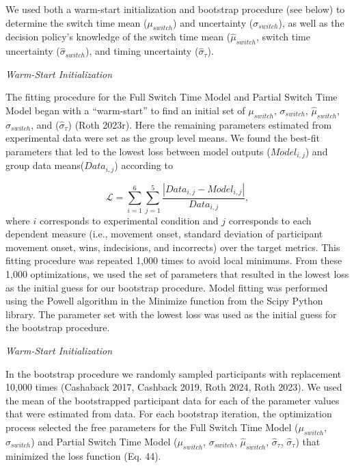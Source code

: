 \documentclass[12pt,letterpaper]{article}
\begin{document}
We used both a warm-start initialization and bootstrap procedure (see below) to determine the switch time mean ($\mu_{switch}$) and uncertainty ($\sigma_{switch}$), as well as the decision policy’s knowledge of the switch time mean ($\hat{\mu}_{switch}$, switch time uncertainty ($\hat{\sigma}_{switch}$), and timing uncertainty ($\hat{\sigma}_{\tau}$).

\noindent\emph{Warm-Start Initialization}

\noindent The fitting procedure for the Full Switch Time Model and Partial Switch Time Model began with a “warm-start” to find an initial set of $\mu_{switch}$, $\sigma_{switch}$, $\hat{\mu}_{switch}$, $\hat{\sigma}_{switch}$, and ($\hat{\sigma}_{\tau}$) (Roth 2023r).  Here the remaining parameters estimated from experimental data were set as the group level means. We found the best-fit parameters that led to the lowest loss between model outputs ($Model_{i,j}$) and group data means($Data_{i,j}$) according to

\begin{equation}
    \mathcal{L} = \sum_{i = 1}^{6} \sum_{j = 1}^{5} \frac{|Data_{i,j} - Model_{i,j}|}{Data_{i,j}},
\end{equation}
where $i$ corresponds to experimental condition and $j$ corresponds to each dependent measure (i.e., movement onset, standard deviation of participant movement onset, wins, indecisions, and incorrects) over the target metrics. This fitting procedure was repeated 1,000 times to avoid local minimums. From these 1,000 optimizations, we used the set of parameters that resulted in the lowest loss as the initial guess for our bootstrap procedure. Model fitting was performed using the Powell algorithm in the Minimize function from the Scipy Python library. The parameter set with the lowest loss was used as the initial guess for the bootstrap procedure.

\noindent\emph{Warm-Start Initialization}

\noindent In the bootstrap procedure we randomly sampled participants with replacement 10,000 times (Cashaback 2017, Cashback 2019, Roth 2024, Roth 2023). We used the mean of the bootstrapped participant data for each of the parameter values that were estimated from data. For each bootstrap iteration, the optimization process selected the free parameters for the Full Switch Time Model ($\mu_{switch}$, $\sigma_{switch}$) and Partial Switch Time Model ($\mu_{switch}$, $\sigma_{switch}$, $\hat{\mu}_{switch}$, $\hat{\sigma}_{\tau}$, $\hat{\sigma}_{\tau}$) that minimized the loss function (Eq. 44).
\end{document}
